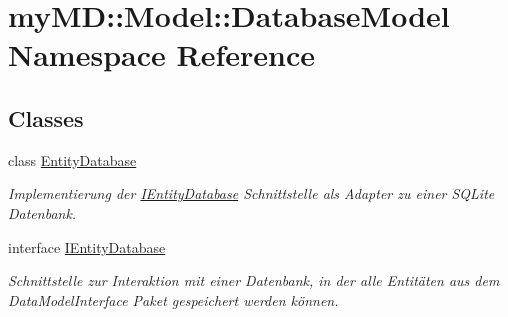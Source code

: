 \hypertarget{namespacemy_m_d_1_1_model_1_1_database_model}{
\section{my\-MD::Model::Database\-Model Namespace Reference}
\label{d0/d95/namespacemy_m_d_1_1_model_1_1_database_model}
}


\subsection*{Classes}
\begin{CompactItemize}
\item 
class \hyperlink{classmy_m_d_1_1_model_1_1_database_model_1_1_entity_database}{Entity\-Database}
\begin{CompactList}\small\item\em Implementierung der \hyperlink{interfacemy_m_d_1_1_model_1_1_database_model_1_1_i_entity_database}{IEntity\-Database} Schnittstelle als Adapter zu einer SQLite Datenbank. \item\end{CompactList}\item 
interface \hyperlink{interfacemy_m_d_1_1_model_1_1_database_model_1_1_i_entity_database}{IEntity\-Database}
\begin{CompactList}\small\item\em Schnittstelle zur Interaktion mit einer Datenbank, in der alle Entit\"{a}ten aus dem Data\-Model\-Interface Paket gespeichert werden k\"{o}nnen. \item\end{CompactList}\end{CompactItemize}
